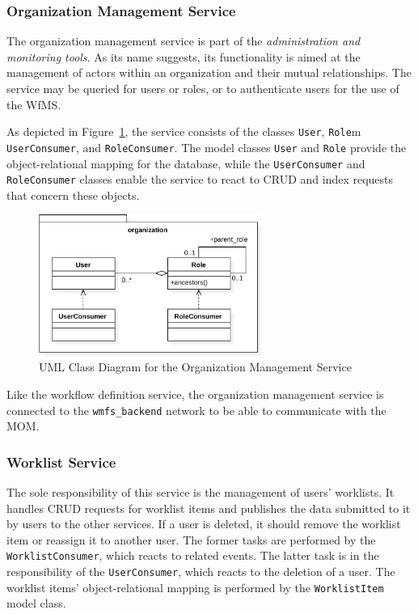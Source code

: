   \subsubsection{Organization Management Service} %
    \label{subs:organization_management_service}
    The organization management service is part of the \emph{administration and monitoring tools}.
    As its name suggests, its functionality is aimed at the management of actors within an organization and their mutual relationships. The service may be queried for users or roles, or to authenticate users for the use of the \ac{WfMS}.

    As depicted in Figure~\ref{fig:uml_class_diagram_for_the_organization_service}, the service consists of the classes \texttt{User}, \texttt{Role}m \texttt{UserConsumer}, and \texttt{RoleConsumer}.
    The model classes \texttt{User} and \texttt{Role} provide the object-relational mapping for the database, while the \texttt{UserConsumer} and \texttt{RoleConsumer} classes enable the service to react to \ac{CRUD} and index requests that concern these objects.

    \begin{figure}[htbp]
      \centering
      \includegraphics[width=0.65\textwidth]{content/images/class_diagram_organization-crop.pdf}
      \caption{UML Class Diagram for the Organization Management Service}
      \label{fig:uml_class_diagram_for_the_organization_service}
    \end{figure}

    Like the workflow definition service, the organization management service is connected to the \texttt{wmfs\_backend} network to be able to communicate with the \ac{MOM}.

  \subsubsection{Worklist Service} %
    \label{subs:worklist_service}
    The sole responsibility of this service is the management of users' worklists. It handles \ac{CRUD} requests for worklist items and publishes the data submitted to it by users to the other services. If a user is deleted, it should remove the worklist item or reassign it to another user. The former tasks are performed by the \texttt{WorklistConsumer}, which reacts to related events. The latter task is in the responsibility of the \texttt{UserConsumer}, which reacts to the deletion of a user. The worklist items' object-relational mapping is performed by the \texttt{WorklistItem} model class.

